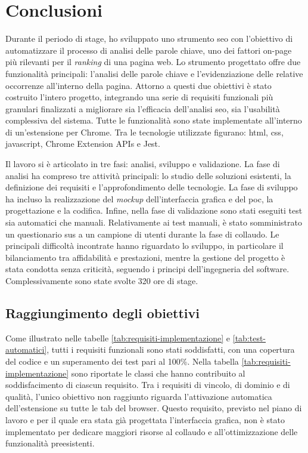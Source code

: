 \chapter{Conclusioni}
\label{cap:conclusioni}

Durante il periodo di stage, ho sviluppato uno strumento \gls{seo} con l’obiettivo di automatizzare il processo di analisi delle parole chiave, uno dei fattori \gls{on-page} più rilevanti per il \textit{ranking} di una pagina web. Lo strumento progettato offre due funzionalità principali: l’analisi delle parole chiave e l’evidenziazione delle relative occorrenze all’interno della pagina. Attorno a questi due obiettivi è stato costruito l’intero progetto, integrando una serie di requisiti funzionali più granulari finalizzati a migliorare sia l’efficacia dell’analisi \gls{seo}, sia l’usabilità complessiva del sistema. Tutte le funzionalità sono state implementate all’interno di un’estensione per Chrome. Tra le tecnologie utilizzate figurano: \gls{html}, \gls{css}, \gls{javascript}, Chrome Extension APIs e Jest.

\vspace{10pt}
\noindent Il lavoro si è articolato in tre fasi: analisi, sviluppo e validazione. La fase di analisi ha compreso tre attività principali: lo studio delle soluzioni esistenti, la definizione dei \gls{requisiti} e l’approfondimento delle tecnologie. La fase di sviluppo ha incluso la realizzazione del \textit{mockup} dell'interfaccia grafica e del \gls{poc}, la progettazione e la codifica. Infine, nella fase di validazione sono stati eseguiti test sia automatici che manuali. Relativamente ai test manuali, è stato somministrato un questionario \gls{sus} a un campione di utenti durante la fase di collaudo. Le principali difficoltà incontrate hanno riguardato lo sviluppo, in particolare il bilanciamento tra affidabilità e prestazioni, mentre la gestione del progetto è stata condotta senza criticità, seguendo i principi dell’ingegneria del software. Complessivamente sono state svolte 320 ore di stage.

\section{Raggiungimento degli obiettivi}

Come illustrato nelle tabelle \ref{tab:requisiti-implementazione} e \ref{tab:test-automatici}, tutti i \gls{requisiti} funzionali sono stati soddisfatti, con una copertura del codice e un superamento dei test pari al 100\%. Nella tabella \ref{tab:requisiti-implementazione} sono riportate le classi che hanno contribuito al soddisfacimento di ciascun requisito. Tra i \gls{requisiti} di vincolo, di dominio e di qualità, l’unico obiettivo non raggiunto riguarda l’attivazione automatica dell’estensione su tutte le tab del browser. Questo requisito, previsto nel piano di lavoro e per il quale era stata già progettata l’interfaccia grafica, non è stato implementato per dedicare maggiori risorse al collaudo e all’ottimizzazione delle funzionalità preesistenti.

